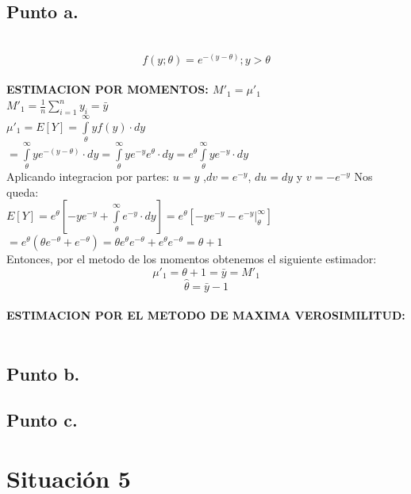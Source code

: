 \documentclass[letterpaper,12pt,onecolumn,titlepage]{article}
\begin{document}
\subsection{Punto a.}
~\\ $$f(y;\theta)=e^{-(y-\theta)};  y>\theta$$  
~\\ \textbf{ESTIMACION POR MOMENTOS: $M'_1=\mu'_1$}
~\\ $M'_1=\frac{1}{n}\sum_{i=1}^{n}{y_{i}}=\bar{y}$
~\\ $\mu'_1=E[Y]=\int \limits_{\theta}^{\infty} y f(y) \cdot dy$
~\\ $=\int \limits_{\theta}^{\infty} ye^{-(y-\theta)} \cdot dy=\int \limits_{\theta}^{\infty} ye^{-y}e^\theta \cdot dy=e^\theta\int \limits_{\theta}^{\infty}ye^{-y} \cdot dy$
~\\ Aplicando integracion por partes: $u=y$ ,$dv=e^{-y}$, $du=dy$ y $v=-e^{-y}$ Nos queda:
~\\ $E[Y]=e^{\theta}[-ye^{-y}+\int \limits_{\theta}^{\infty}e^{-y} \cdot dy] =e^{\theta}[-ye^{-y}- e^{-y}|_{\theta}^{\infty}] $
~\\ $=e^{\theta}(\theta e^{-\theta}+e^{-\theta})=\theta e^{\theta}e^{-\theta}+e^{\theta}e^{-\theta}= \theta + 1 $ 
~\\ Entonces, por el metodo de los momentos obtenemos el siguiente estimador:
~\\ $$\mu'_1=\theta + 1= \bar{y} = M'_1$$
 $$\hat{\theta}=\bar{y}-1$$
~\\ \textbf{ESTIMACION POR EL METODO DE MAXIMA VEROSIMILITUD:}
~\\

\subsection{Punto b.}
\subsection{Punto c.}

\pagebreak\section{Situaci\'{o}n 5}
\end{document}
